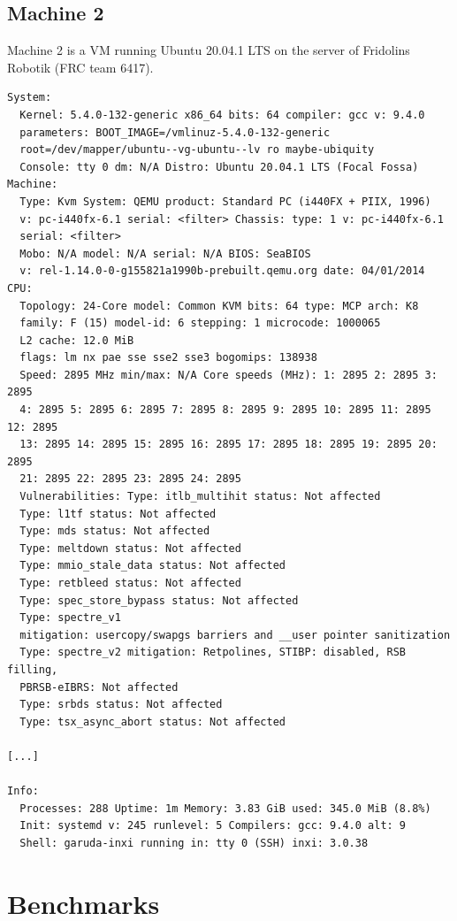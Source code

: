 \documentclass[11pt,DIV=10,final]{scrreprt} %
\begin{document}
\begin{appendix}
{\subsection{Machine 2}\label{specs:m2}
Machine 2 is a VM running Ubuntu 20.04.1 LTS on the server of Fridolins Robotik (FRC team 6417).
\begin{verbatim}
System:
  Kernel: 5.4.0-132-generic x86_64 bits: 64 compiler: gcc v: 9.4.0
  parameters: BOOT_IMAGE=/vmlinuz-5.4.0-132-generic
  root=/dev/mapper/ubuntu--vg-ubuntu--lv ro maybe-ubiquity
  Console: tty 0 dm: N/A Distro: Ubuntu 20.04.1 LTS (Focal Fossa)
Machine:
  Type: Kvm System: QEMU product: Standard PC (i440FX + PIIX, 1996)
  v: pc-i440fx-6.1 serial: <filter> Chassis: type: 1 v: pc-i440fx-6.1
  serial: <filter>
  Mobo: N/A model: N/A serial: N/A BIOS: SeaBIOS
  v: rel-1.14.0-0-g155821a1990b-prebuilt.qemu.org date: 04/01/2014
CPU:
  Topology: 24-Core model: Common KVM bits: 64 type: MCP arch: K8
  family: F (15) model-id: 6 stepping: 1 microcode: 1000065
  L2 cache: 12.0 MiB
  flags: lm nx pae sse sse2 sse3 bogomips: 138938
  Speed: 2895 MHz min/max: N/A Core speeds (MHz): 1: 2895 2: 2895 3: 2895
  4: 2895 5: 2895 6: 2895 7: 2895 8: 2895 9: 2895 10: 2895 11: 2895 12: 2895
  13: 2895 14: 2895 15: 2895 16: 2895 17: 2895 18: 2895 19: 2895 20: 2895
  21: 2895 22: 2895 23: 2895 24: 2895
  Vulnerabilities: Type: itlb_multihit status: Not affected
  Type: l1tf status: Not affected
  Type: mds status: Not affected
  Type: meltdown status: Not affected
  Type: mmio_stale_data status: Not affected
  Type: retbleed status: Not affected
  Type: spec_store_bypass status: Not affected
  Type: spectre_v1
  mitigation: usercopy/swapgs barriers and __user pointer sanitization
  Type: spectre_v2 mitigation: Retpolines, STIBP: disabled, RSB filling,
  PBRSB-eIBRS: Not affected
  Type: srbds status: Not affected
  Type: tsx_async_abort status: Not affected

[...]

Info:
  Processes: 288 Uptime: 1m Memory: 3.83 GiB used: 345.0 MiB (8.8%)
  Init: systemd v: 245 runlevel: 5 Compilers: gcc: 9.4.0 alt: 9
  Shell: garuda-inxi running in: tty 0 (SSH) inxi: 3.0.38
\end{verbatim}

\section{Benchmarks}\label{sec:app:benchmarks}
}
\end{appendix}
\end{document}
